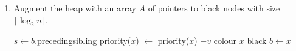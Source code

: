 \documentclass[10pt]{article}
\begin{document}
\begin{enumerate}
	\item
	\begin{comment}
		The operation DECREASE-KEY(H, x, v) takes a node $x$ in a black$&$white
		heap H and a value $v$ and decrease the priority of $x$ by $v$. 
		Explain how to perform DECREASE-KEY(H, x, v) in a black$&$white heap so
		that its amortized cost in $O(1)$.
		Use the number of black nodes in the black$&$white heap as your potential
		function or, equivalently, maintain the invariant that there is one
		token on each black node.
	\end{comment}
		Augment the heap with an array $A$ of pointers to black nodes with size
		$\lceil \log_2 n \rceil$.

		\begin{algorithmic}[1]
				\State $s \gets b$.precedingsibling
				\State priority($x$) $\gets$ priority($x$) $- v$
						\State colour $x$ black
						\State $b \gets x$
					\EndIf
				\EndIf
			\EndFunction
		\end{algorithmic}

\end{enumerate}
\end{document}
